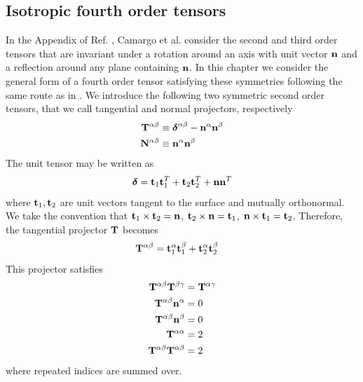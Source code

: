 \documentclass[b5paper,openright,11pt]{book}
\begin{document}
\begin{appendices}
\chapter{Isotropic fourth order tensors}
\label{Ap:Iso}
In the  Appendix of  Ref. \cite{CamargoBC2018},  Camargo et al. consider  the second  and third
order tensors that are invariant under  a rotation around an axis with
unit vector  ${\bf n}$  and a  reflection around any
plane containing ${\bf n}$. In this chapter  we consider  the general
form  of a  fourth order  tensor satisfying these symmetries following the same route as in \cite{CamargoBC2018}.
We introduce the following two
symmetric second  order tensors,  that we  call tangential  and normal
projectors, respectively
\begin{align}
  {\bf T}^{\alpha\beta}&\equiv\boldsymbol{\delta}^{\alpha\beta}-{\bf n}^\alpha{\bf n}^\beta
\nonumber\\
{\bf  N}^{\alpha\beta}&\equiv{\bf n}^\alpha{\bf n}^\beta
\end{align}
The unit tensor may be 
written as
\begin{align}
\boldsymbol{\delta}={\bf t}_1{\bf t}_1^T+{\bf t}_2{\bf t}_2^T+{\bf n}{\bf n}^T
\end{align}
where ${\bf  t}_1,{\bf t}_2$ are  unit vectors tangent to  the surface
and  mutually   orthonormal.   We  take  the   convention  that  ${\bf
  t}_1\times{\bf  t}_2={\bf n}$,  ${\bf t}_2\times{\bf  n}={\bf t}_1$,
${\bf     n}\times{\bf     t}_1={\bf    t}_2$.      Therefore,     the
tangential projector ${\bf T}$ becomes
\begin{align}
    {\bf T}^{\alpha\beta}&={\bf t}_1^\alpha{\bf t}_1^\beta+{\bf t}^\alpha_2{\bf t}_2^\beta
\end{align}
This projector satisfies
\begin{align}
  {\bf T}^{\alpha\beta}  {\bf T}^{\beta\gamma}&= {\bf T}^{\alpha\gamma} 
\nonumber\\
  {\bf T}^{\alpha\beta}{\bf n}^\alpha&=0
\nonumber\\
  {\bf T}^{\alpha\beta}{\bf n}^\beta&=0
\nonumber\\
  {\bf T}^{\alpha\alpha}&=2
\nonumber\\
  {\bf T}^{\alpha\beta}  {\bf T}^{\alpha\beta}&=2
\label{tprop}
\end{align}
where repeated indices are summed over. 


\end{appendices}
\end{document}
